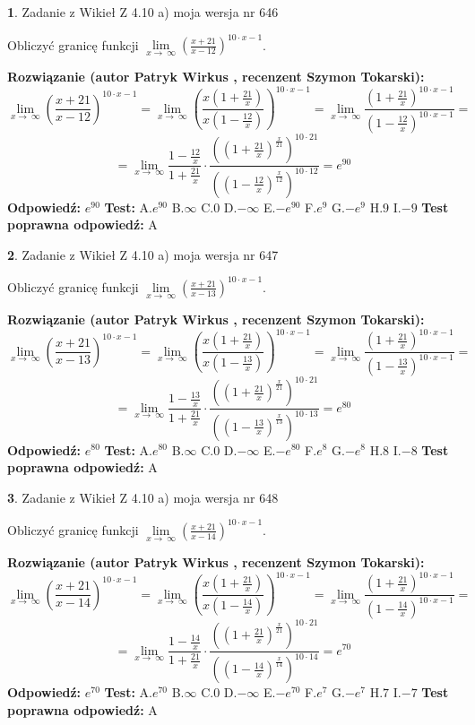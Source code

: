 \documentclass[12pt, a4paper]{article}
\theoremstyle{definition} %
\newtheorem{zad}{}
\newcommand{\zadStart}[1]{\begin{zad}#1\newline}
\newcommand{\zadStop}{\end{zad}}
\newcommand{\rozwStart}[2]{\noindent \textbf{Rozwiązanie (autor #1 , recenzent #2): }\newline}
\newcommand{\rozwStop}{\newline}
\newcommand{\odpStart}{\noindent \textbf{Odpowiedź:}\newline}
\newcommand{\odpStop}{\newline}
\newcommand{\testStart}{\noindent \textbf{Test:}\newline}
\newcommand{\testStop}{\newline}
\newcommand{\kluczStart}{\noindent \textbf{Test poprawna odpowiedź:}\newline}
\newcommand{\kluczStop}{\newline}
\begin{document}
\zadStart{Zadanie z Wikieł Z 4.10 a) moja wersja nr 646}

Obliczyć granicę funkcji  $\lim\limits_{x\to\ \infty}(\frac{x+21}{x-12})^{10\cdot x-1}$.
\zadStop
\rozwStart{Patryk Wirkus}{Szymon Tokarski}
$$\lim\limits_{x\to\ \infty}(\frac{x+21}{x-12})^{10\cdot x-1} = \lim\limits_{x\to\ \infty}(\frac{x(1+\frac{21}{x})}{x(1-\frac{12}{x})})^{10\cdot x-1}=\lim\limits_{x\to\ \infty}\frac{(1+\frac{21}{x})^{10\cdot x-1}}{(1-\frac{12}{x})^{10\cdot x-1}}=$$
$$=\lim\limits_{x\to\ \infty}\frac{1-\frac{12}{x}}{1+\frac{21}{x}}\cdot\frac{((1+\frac{21}{x})^{\frac{x}{21}})^{10\cdot21}}{((1-\frac{12}{x})^{\frac{x}{12}})^{10\cdot12}}=e^{90}$$
\rozwStop
\odpStart
$e^{90}$
\odpStop
\testStart
A.$e^{90}$ B.$\infty$ C.$0$ D.$-\infty$ E.$-e^{90}$
F.$e^{9}$ G.$-e^{9}$
H.$9$
I.$-9$
\testStop
\kluczStart
A
\kluczStop



\zadStart{Zadanie z Wikieł Z 4.10 a) moja wersja nr 647}

Obliczyć granicę funkcji  $\lim\limits_{x\to\ \infty}(\frac{x+21}{x-13})^{10\cdot x-1}$.
\zadStop
\rozwStart{Patryk Wirkus}{Szymon Tokarski}
$$\lim\limits_{x\to\ \infty}(\frac{x+21}{x-13})^{10\cdot x-1} = \lim\limits_{x\to\ \infty}(\frac{x(1+\frac{21}{x})}{x(1-\frac{13}{x})})^{10\cdot x-1}=\lim\limits_{x\to\ \infty}\frac{(1+\frac{21}{x})^{10\cdot x-1}}{(1-\frac{13}{x})^{10\cdot x-1}}=$$
$$=\lim\limits_{x\to\ \infty}\frac{1-\frac{13}{x}}{1+\frac{21}{x}}\cdot\frac{((1+\frac{21}{x})^{\frac{x}{21}})^{10\cdot21}}{((1-\frac{13}{x})^{\frac{x}{13}})^{10\cdot13}}=e^{80}$$
\rozwStop
\odpStart
$e^{80}$
\odpStop
\testStart
A.$e^{80}$ B.$\infty$ C.$0$ D.$-\infty$ E.$-e^{80}$
F.$e^{8}$ G.$-e^{8}$
H.$8$
I.$-8$
\testStop
\kluczStart
A
\kluczStop



\zadStart{Zadanie z Wikieł Z 4.10 a) moja wersja nr 648}

Obliczyć granicę funkcji  $\lim\limits_{x\to\ \infty}(\frac{x+21}{x-14})^{10\cdot x-1}$.
\zadStop
\rozwStart{Patryk Wirkus}{Szymon Tokarski}
$$\lim\limits_{x\to\ \infty}(\frac{x+21}{x-14})^{10\cdot x-1} = \lim\limits_{x\to\ \infty}(\frac{x(1+\frac{21}{x})}{x(1-\frac{14}{x})})^{10\cdot x-1}=\lim\limits_{x\to\ \infty}\frac{(1+\frac{21}{x})^{10\cdot x-1}}{(1-\frac{14}{x})^{10\cdot x-1}}=$$
$$=\lim\limits_{x\to\ \infty}\frac{1-\frac{14}{x}}{1+\frac{21}{x}}\cdot\frac{((1+\frac{21}{x})^{\frac{x}{21}})^{10\cdot21}}{((1-\frac{14}{x})^{\frac{x}{14}})^{10\cdot14}}=e^{70}$$
\rozwStop
\odpStart
$e^{70}$
\odpStop
\testStart
A.$e^{70}$ B.$\infty$ C.$0$ D.$-\infty$ E.$-e^{70}$
F.$e^{7}$ G.$-e^{7}$
H.$7$
I.$-7$
\testStop
\kluczStart
A
\kluczStop
\end{document}
